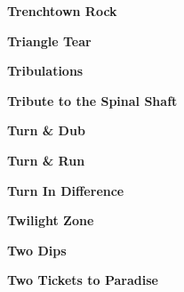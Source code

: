 \begin{center}\textbf{Trenchtown Rock}\end{center}
\newline
\vspace{10pt} 
\begin{center}\textbf{Triangle Tear}\end{center}
\newline
\vspace{10pt} 
\begin{center}\textbf{Tribulations}\end{center}
\newline
\vspace{10pt} 
\begin{center}\textbf{Tribute to the Spinal Shaft}\end{center}
\newline
\vspace{10pt} 
\begin{center}\textbf{Turn \& Dub}\end{center}
\newline
\vspace{10pt} 
\begin{center}\textbf{Turn \& Run}\end{center}
\newline
\vspace{10pt} 
\begin{center}\textbf{Turn In Difference}\end{center}
\newline
\vspace{10pt} 
\begin{center}\textbf{Twilight Zone}\end{center}
\newline
\vspace{10pt} 
\begin{center}\textbf{Two Dips}\end{center}
\newline
\vspace{10pt} 
\begin{center}\textbf{Two Tickets to Paradise}\end{center}
